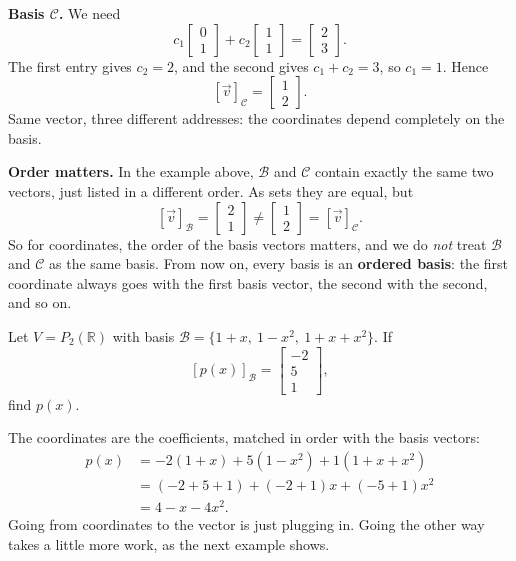 \begin{example}
\begin{solution}
\textbf{Basis $\mathcal{C}$.} We need
\[
c_1\begin{bmatrix} 0 \\ 1 \end{bmatrix} + c_2\begin{bmatrix} 1 \\ 1 \end{bmatrix} = \begin{bmatrix} 2 \\ 3 \end{bmatrix}.
\]
The first entry gives $c_2 = 2$, and the second gives $c_1 + c_2 = 3$, so $c_1 = 1$. Hence
\[
[\vec{v}]_{\mathcal{C}} = \begin{bmatrix} 1 \\ 2 \end{bmatrix}.
\]
Same vector, three different addresses: the coordinates depend completely on the basis.
\end{solution}
\end{example}

\begin{remark}
\textbf{Order matters.} In the example above, $\mathcal{B}$ and $\mathcal{C}$ contain exactly the same two vectors, just listed in a different order. As sets they are equal, but
\[
[\vec{v}]_{\mathcal{B}} = \begin{bmatrix} 2 \\ 1 \end{bmatrix} \neq \begin{bmatrix} 1 \\ 2 \end{bmatrix} = [\vec{v}]_{\mathcal{C}}.
\]
So for coordinates, the order of the basis vectors matters, and we do \emph{not} treat $\mathcal{B}$ and $\mathcal{C}$ as the same basis. From now on, every basis is an \textbf{ordered basis}: the first coordinate always goes with the first basis vector, the second with the second, and so on.
\end{remark}

\begin{example}
Let $V = P_2(\mathbb{R})$ with basis $\mathcal{B} = \{1 + x, \ 1 - x^2, \ 1 + x + x^2\}$. If
\[
[p(x)]_{\mathcal{B}} = \begin{bmatrix} -2 \\ 5 \\ 1 \end{bmatrix},
\]
find $p(x)$.

\begin{solution}
The coordinates are the coefficients, matched in order with the basis vectors:
\begin{align*}
p(x) &= -2(1 + x) + 5(1 - x^2) + 1(1 + x + x^2) \\
     &= (-2 + 5 + 1) + (-2 + 1)x + (-5 + 1)x^2 \\
     &= 4 - x - 4x^2.
\end{align*}
Going from coordinates to the vector is just plugging in. Going the other way takes a little more work, as the next example shows.
\end{solution}
\end{example}

